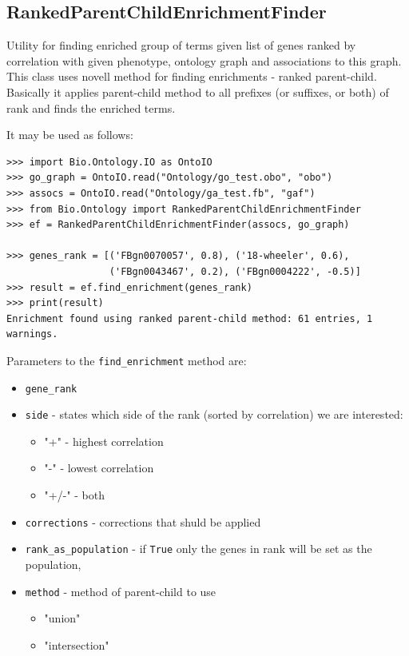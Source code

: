 \documentclass{report}
\begin{document}
\subsection{RankedParentChildEnrichmentFinder}
Utility for finding enriched group of terms given list of genes ranked
by correlation with given phenotype, ontology graph and associations to this graph.
This class uses novell method for finding enrichments -
ranked parent-child. Basically it applies parent-child method
to all prefixes (or suffixes, or both) of rank and finds the
enriched terms.

It may be used as follows:
\begin{verbatim}
>>> import Bio.Ontology.IO as OntoIO
>>> go_graph = OntoIO.read("Ontology/go_test.obo", "obo")
>>> assocs = OntoIO.read("Ontology/ga_test.fb", "gaf")
>>> from Bio.Ontology import RankedParentChildEnrichmentFinder
>>> ef = RankedParentChildEnrichmentFinder(assocs, go_graph)

>>> genes_rank = [('FBgn0070057', 0.8), ('18-wheeler', 0.6),
                  ('FBgn0043467', 0.2), ('FBgn0004222', -0.5)]
>>> result = ef.find_enrichment(genes_rank)
>>> print(result)
Enrichment found using ranked parent-child method: 61 entries, 1 warnings.
\end{verbatim}

Parameters to the \verb|find_enrichment| method are:
\begin{itemize}
\item \verb|gene_rank|
\item \verb|side| - states which side of the rank (sorted by correlation)
we are interested:
\begin{itemize}
\item "+" - highest correlation
\item "-" - lowest correlation
\item "+/-" - both
\end{itemize}
\item \verb|corrections| - corrections that shuld be applied
\item \verb|rank_as_population| - if \verb|True| only the  genes in rank 
will be set as the population,
\item \verb|method| - method of parent-child to use
\begin{itemize}
\item "union"
\item "intersection"
\end{itemize}
\end{itemize}
\end{document}
